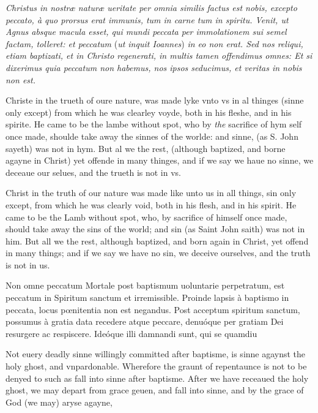 
\emph{Christus in nostræ naturæ ueritate per omnia similis factus est nobis, excepto peccato, à quo prorsus erat immunis, tum in carne tum in spiritu. Venit, ut Agnus absque macula esset, qui mundi peccata per immolationem sui semel factam, tolleret: et peccatum} (\emph{ut inquit Ioannes}) \emph{in eo non erat. Sed nos reliqui, etiam baptizati, et in Christo regenerati, in multis tamen offendimus omnes: Et si dixerimus quia peccatum non habemus, nos ipsos seducimus, et veritas in nobis non est.}

Christe in the trueth of oure nature, was made lyke vnto vs in al thinges (sinne only except) from which he was clearley voyde, both in his fleshe, and in his spirite. He came to be the lambe without spot, who by \emph{the} sacrifice of hym self once made, shoulde take away the sinnes of the worlde: and sinne, (as S. John sayeth) was not in hym. But al we the rest, (although baptized, and borne agayne in Christ) yet offende in many thinges, and if we say we haue no sinne, we deceaue our selues, and the trueth is not in vs.

Christ in the truth of our nature was made like unto us in all things, sin only except, from which he was clearly void, both in his flesh, and in his spirit. He came to be the Lamb without spot, who, by sacrifice of himself once made, should take away the sins of the world; and sin (as Saint John saith) was not in him. But all we the rest, although baptized, and born again in Christ, yet offend in many things; and if we say we have no sin, we deceive ourselves, and the truth is not in us.


Non omne peccatum Mortale post baptismum uoluntarie perpetratum, est peccatum in Spiritum sanctum et irremissible. Proinde lapsis à baptismo in peccata, locus pœnitentia non est negandus. Post acceptum spiritum sanctum, possumus à gratia data recedere atque peccare, denuóque per gratiam Dei resurgere ac respiscere. Ideóque illi damnandi sunt, qui se quamdiu

Not euery deadly sinne willingly committed after baptisme, is sinne agaynst the holy ghost, and vnpardonable. Wherefore the graunt of repentaunce is not to be denyed to such as fall into sinne after baptisme. After we have receaued the holy ghost, we may depart from grace geuen, and fall into sinne, and by the grace of God (we may) aryse agayne,

